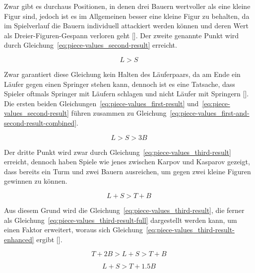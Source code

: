 \noindent Zwar gibt es durchaus Positionen, in denen drei Bauern wertvoller als eine kleine Figur sind, jedoch ist es im Allgemeinen besser eine kleine Figur zu behalten, da im Spielverlauf die Bauern individuell attackiert werden können und deren Wert als Dreier-Figuren-Gespann verloren geht [\cite{Wiki2018}].
Der zweite genannte Punkt wird durch Gleichung~\ref{eq:piece-values_second-result} erreicht.

\begin{equation} \label{eq:piece-values_second-result}
    L > S
\end{equation}

\noindent Zwar garantiert diese Gleichung kein Halten des Läuferpaars, da am Ende ein Läufer gegen einen Springer stehen kann, dennoch ist es eine Tatsache, dass Spieler oftmals Springer mit Läufern schlagen und nicht Läufer mit Springern [\cite{Wiki2018}].
Die ersten beiden Gleichungen~\ref{eq:piece-values_first-result} und~\ref{eq:piece-values_second-result} führen zusammen zu Gleichung~\ref{eq:piece-values_first-and-second-result-combined}.

\begin{equation} \label{eq:piece-values_first-and-second-result-combined}
    L > S > 3B
\end{equation}

\noindent Der dritte Punkt wird zwar durch Gleichung~\ref{eq:piece-values_third-result} erreicht, dennoch haben Spiele wie jenes zwischen Karpov und Kasparov gezeigt, dass bereits ein Turm und zwei Bauern ausreichen, um gegen zwei kleine Figuren gewinnen zu können.

\begin{equation} \label{eq:piece-values_third-result}
    L + S > T + B
\end{equation}

\noindent Aus diesem Grund wird die Gleichung~\ref{eq:piece-values_third-result}, die ferner als Gleichung~\ref{eq:piece-values_third-result-full} dargestellt werden kann, um einen Faktor erweitert, woraus sich Gleichung~\ref{eq:piece-values_third-result-enhanced} ergibt [\cite{Wiki2018}].

\begin{equation} \label{eq:piece-values_third-result-full}
    T + 2B > L + S > T + B
\end{equation}

\begin{equation} \label{eq:piece-values_third-result-enhanced}
    L + S > T + 1.5B
\end{equation}

